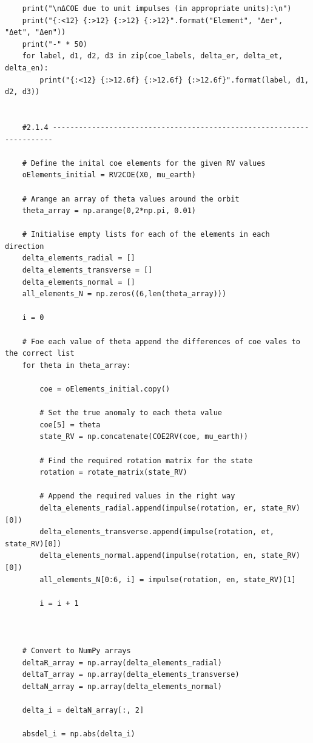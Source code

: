 \documentclass[12pt,twocolumn]{article}  %
\begin{document}
\begin{lstlisting}
    print("\nΔCOE due to unit impulses (in appropriate units):\n")
    print("{:<12} {:>12} {:>12} {:>12}".format("Element", "Δer", "Δet", "Δen"))
    print("-" * 50)
    for label, d1, d2, d3 in zip(coe_labels, delta_er, delta_et, delta_en):
        print("{:<12} {:>12.6f} {:>12.6f} {:>12.6f}".format(label, d1, d2, d3))
    
    
    #2.1.4 ----------------------------------------------------------------------
    
    # Define the inital coe elements for the given RV values
    oElements_initial = RV2COE(X0, mu_earth)
    
    # Arange an array of theta values around the orbit
    theta_array = np.arange(0,2*np.pi, 0.01)
    
    # Initialise empty lists for each of the elements in each direction
    delta_elements_radial = []
    delta_elements_transverse = []
    delta_elements_normal = []
    all_elements_N = np.zeros((6,len(theta_array)))
    
    i = 0
    
    # Foe each value of theta append the differences of coe vales to the correct list
    for theta in theta_array:
        
        coe = oElements_initial.copy()
        
        # Set the true anomaly to each theta value
        coe[5] = theta
        state_RV = np.concatenate(COE2RV(coe, mu_earth))
        
        # Find the required rotation matrix for the state
        rotation = rotate_matrix(state_RV)
        
        # Append the required values in the right way
        delta_elements_radial.append(impulse(rotation, er, state_RV)[0])
        delta_elements_transverse.append(impulse(rotation, et, state_RV)[0])
        delta_elements_normal.append(impulse(rotation, en, state_RV)[0])
        all_elements_N[0:6, i] = impulse(rotation, en, state_RV)[1]
        
        i = i + 1
        
       
        
    # Convert to NumPy arrays
    deltaR_array = np.array(delta_elements_radial)
    deltaT_array = np.array(delta_elements_transverse)
    deltaN_array = np.array(delta_elements_normal)
    
    delta_i = deltaN_array[:, 2]
    
    absdel_i = np.abs(delta_i)
    

\end{lstlisting}
\end{document}
